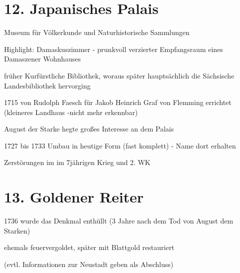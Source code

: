 \documentclass[a4paper,12pt]{report}
\begin{document}
\section{12. Japanisches Palais}
\begin{itemize*}
\item Museum für Völkerkunde und Naturhistorische Sammlungen
\item Highlight: Damaskuszimmer - prunkvoll verzierter Empfangsraum eines Damaszener Wohnhauses
\item früher Kurfürstliche Bibliothek, woraus später hauptsächlich die Sächsische Landesbibliothek hervorging
\item 1715 von Rudolph Faesch für Jakob Heinrich Graf von Flemming errichtet (kleineres Landhaus -nicht mehr erkennbar)
\item August der Starke hegte großes Interesse an dem Palais
\item 1727 bis 1733 Umbau in heutige Form (fast komplett) - Name dort erhalten
\item Zerstörungen im im 7jährigen Krieg und 2. WK
\end{itemize*}

\section{13. Goldener Reiter}
\begin{itemize*}
\item 1736 wurde das Denkmal enthüllt (3 Jahre nach dem Tod von August dem Starken)
\item ehemals feuervergoldet, später mit Blattgold restauriert
\item (evtl. Informationen zur Neustadt geben als Abschluss)
\end{itemize*}
\end{document}
